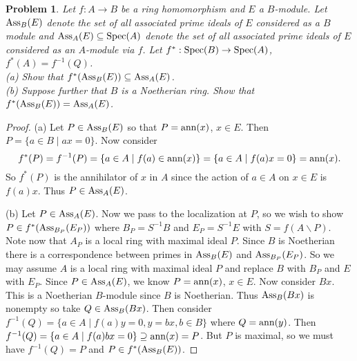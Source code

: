 \documentclass{article}
\newcommand{\ass}{\textup{Ass}}
\newcommand{\ann}{\textup{ann}}
\newcommand{\spec}{\textup{Spec}}
\newtheorem{problem}{Problem}
\begin{document}
\begin{problem}
Let $f : A \to B$ be a ring homomorphism and $E$ a $B$-module. Let $\ass_B(E)$ denote the set of all associated prime ideals of $E$ considered as a $B$ module and $\ass_A(E) \subseteq \spec(A)$ denote the set of all associated prime ideals of $E$ considered as an $A$-module via $f$. Let $f^* : \spec(B) \to \spec(A)$, $f^*(A) = f^{-1}(Q)$.\\
(a) Show that $f^*(\ass_B(E)) \subseteq \ass_A(E)$.\\
(b) Suppose further that $B$ is a Noetherian ring. Show that $f^*(\ass_B(E)) = \ass_A(E)$.
\end{problem}
\begin{proof}
(a) Let $P \in \ass_B(E)$ so that $P = \ann(x)$, $x \in E$. Then $P = \{a \in B \mid ax = 0\}$. Now consider
\[
f^*(P) = f^{-1}(P) = \{a \in A \mid f(a) \in \ann(x)\} = \{a \in A \mid f(a)x = 0\} = \ann(x).
\]
So $f^*(P)$ is the annihilator of $x$ in $A$ since the action of $a \in A$ on $x \in E$ is $f(a)x$. Thus $P \in \ass_A(E)$.

(b) Let $P \in \ass_A(E)$. Now we pass to the localization at $P$, so we wish to show $P \in f^*(\ass_{B_P}(E_P))$ where $B_P = S^{-1}B$ and $E_P = S^{-1}E$ with $S = f(A \backslash P)$. Note now that $A_P$ is a local ring with maximal ideal $P$. Since $B$ is Noetherian there is a correspondence between primes in $\ass_B(E)$ and $\ass_{B_P}(E_P)$. So we may assume $A$ is a local ring with maximal ideal $P$ and replace $B$ with $B_P$ and $E$ with $E_P$. Since $P \in \ass_A(E)$, we know $P = \ann(x)$, $x \in E$. Now consider $Bx$. This is a Noetherian $B$-module since $B$ is Noetherian. Thus $\ass_B(Bx)$ is nonempty so take $Q \in \ass_B(Bx)$. Then consider $f^{-1}(Q) = \{a \in A \mid f(a)y = 0, y = bx, b \in B\}$ where $Q = \ann(y)$. Then $f^{-1}(Q) = \{a \in A \mid f(a)bx = 0\} \supseteq \ann(x) = P$. But $P$ is maximal, so we must have $f^{-1}(Q) = P$ and $P \in f^*(\ass_{B}(E))$.
\end{proof}
\end{document}
